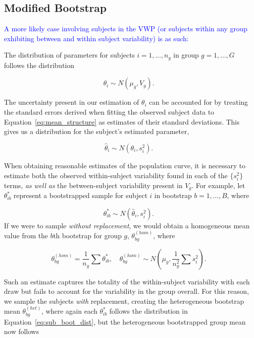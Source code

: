\documentclass{article}
\providecommand{\cn}[1]{\textcolor{blue}{#1}}
\begin{document}
\subsection{Modified Bootstrap}

\cn{A more likely case involving subjects in the VWP (or subjects within any group exhibiting between and within subject variability) is as such: }

The distribution of parameters for subjects $i = 1, \dots, n_g$ in group $g = 1, \dots, G$ follows the distribution

\begin{equation}\label{eq:theta_i_dist}
\theta_i \sim N(\mu_{g}, V_{g}).
\end{equation}

The uncertainty present in our estimation of $\theta_i$ can be accounted for by treating the standard errors derived when fitting the observed subject data to Equation~\ref{eq:mean_structure} as estimates of their standard deviations. This gives us a distribution for the subject's estimated parameter, 

\begin{equation}
\hat{\theta}_i \sim N(\theta_i, s_i^2).
\end{equation}

When obtaining reasonable estimates of the population curve, it is necessary to estimate both the observed within-subject variability found in each of the $\{s_i^2\}$ terms, \textit{as well as} the between-subject variability present in $V_{g}$. For example, let $\theta^*_{ib}$ represent a bootstrapped sample for subject $i$ in bootstrap $b = 1, \dots, B$, where

\begin{equation}\label{eq:sub_boot_dist}
\theta^*_{ib} \sim N(\hat{\theta}_i, s_i^2).
\end{equation}
If we were to sample \textit{without replacement}, we would obtain a homogeneous mean value from the $b$th bootstrap for group $g$, $\theta^{(hom)}_{bg}$, where

\begin{equation}\label{eq:wo_rep_boot}
\theta^{(hom)}_{bg} = \frac{1}{n_g} \sum \theta^{*}_{ib}, \quad \theta^{(hom)}_{bg} \sim N \left( \mu_{g}, \frac{1}{n_g^2} \sum s_i^2 \right).
\end{equation}

Such an estimate captures the totality of the within-subject variability with each draw but fails to account for the variability in the group overall. For this reason, we sample the subjects \textit{with} replacement, creating the heterogeneous bootstrap mean $\theta_{bg}^{(het)}$, where again each $\theta_{ib}^*$ follows the distribution in Equation~\ref{eq:sub_boot_dist}, but the heterogeneous bootstrapped group mean now follows
\end{document}
